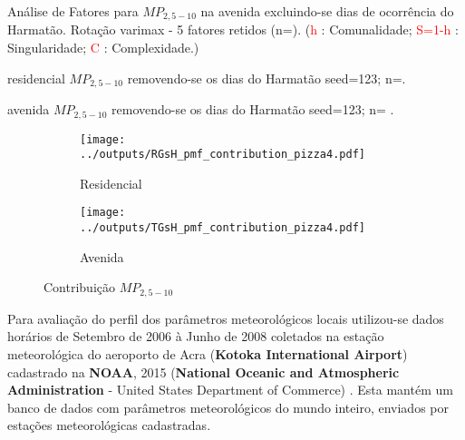 \begin{table}[H]
  
  \caption{Análise de Fatores para $MP_{2,5-10}$ na avenida
           excluindo-se dias de ocorrência do Harmatão.
           Rotação varimax - 5 fatores retidos (n=).
           (\textcolor{red}{h} : Comunalidade; 
           \textcolor{red}{S=1-h} : Singularidade; 
           \textcolor{red}{C} : Complexidade.)
           \label{table:beautifulFAdisplay_TGsH4}}
\end{table}

\begin{table}[H]
  \centering
    
    \caption{residencial $MP_{2,5-10}$ removendo-se os dias do Harmatão 
              seed=123; n=. 
             \label{table:RGsH_profiles4}}
\end{table}

\begin{table}[H]
  \centering
    
    \caption{avenida $MP_{2,5-10}$ removendo-se os dias do Harmatão 
              seed=123; n= . 
             \label{table:TGsH_profiles4}}
\end{table}


\begin{figure}[H]
  \centering
  \begin{subfigure}[b]{0.45\textwidth}
    \texttt{[image: ../outputs/RGsH\_pmf\_contribution\_pizza4.pdf]}
    \caption{Residencial}
  \end{subfigure}%
  \begin{subfigure}[b]{0.45\textwidth}
    \texttt{[image: ../outputs/TGsH\_pmf\_contribution\_pizza4.pdf]}
    \caption{Avenida}
  \end{subfigure}
  \caption{Contribuição $MP_{2,5-10}$ \label{qqq}}
\end{figure}


Para avaliação do perfil dos parâmetros meteorológicos locais
utilizou-se dados horários de Setembro de 2006 à Junho de 2008 
coletados na estação meteorológica do aeroporto de Acra 
(\textbf{Kotoka International Airport}) cadastrado na \textbf{NOAA}, 2015 (\textbf{National Oceanic 
and Atmospheric Administration} - United States Department of Commerce)%
. Esta mantém um banco de dados com parâmetros 
meteorológicos do mundo inteiro, enviados por estações meteorológicas 
cadastradas.

